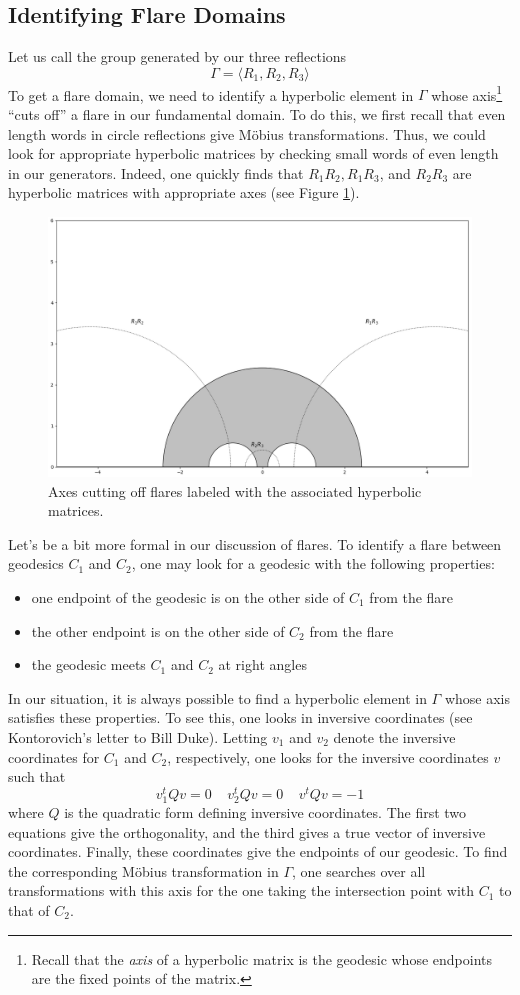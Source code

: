 \documentclass[]{article}
\begin{document}
\subsection*{Identifying Flare Domains}

Let us call the group generated by our three reflections
$$
\Gamma = \langle R_1, R_2, R_3 \rangle
$$
To get a flare domain, we need to identify a hyperbolic element in $\Gamma$ whose axis\footnote{Recall that the \textit{axis} of a hyperbolic matrix is the geodesic whose endpoints are the fixed points of the matrix.} ``cuts off'' a flare in our fundamental domain.
To do this, we first recall that even length words in circle reflections give M\"obius transformations.
Thus, we could look for appropriate hyperbolic matrices by checking small words of even length in our generators.
Indeed, one quickly finds that $R_1R_2, R_1R_3$, and $R_2R_3$ are hyperbolic matrices with appropriate axes (see Figure \ref{UHP_flares}).

\begin{figure}[h]
	\centering
	\includegraphics[width=0.6\linewidth]{UHP_flares.png}
	\caption{Axes cutting off flares labeled with the associated hyperbolic matrices.}
	\label{UHP_flares}
\end{figure}

Let's be a bit more formal in our discussion of flares.
To identify a flare between geodesics $C_1$ and $C_2$, one may look for a geodesic with the following properties:
\begin{itemize}
	\item one endpoint of the geodesic is on the other side of $C_1$ from the flare
	\item the other endpoint is on the other side of $C_2$ from the flare
	\item the geodesic meets $C_1$ and $C_2$ at right angles
\end{itemize}
In our situation, it is always possible to find a hyperbolic element in $\Gamma$ whose axis satisfies these properties.
To see this, one looks in inversive coordinates (see Kontorovich's letter to Bill Duke).
Letting $v_1$ and $v_2$ denote the inversive coordinates for $C_1$ and $C_2$, respectively, one looks for the inversive coordinates $v$ such that
$$
v_1^tQv = 0 ~~~~~ v_2^tQv = 0 ~~~~~ v^tQv = -1
$$
where $Q$ is the quadratic form defining inversive coordinates.
The first two equations give the orthogonality, and the third gives a true vector of inversive coordinates.
Finally, these coordinates give the endpoints of our geodesic.
To find the corresponding M\"obius transformation in $\Gamma$, one searches over all transformations with this axis for the one taking the intersection point with $C_1$ to that of $C_2$.
\end{document}
